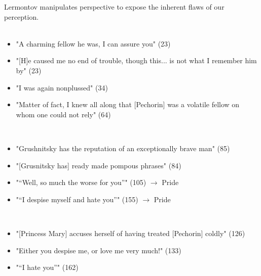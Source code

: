 \documentclass[a4paper]{article}
\begin{document}
    Lermontov manipulates perspective to expose the inherent flaws of our perception.\\

    \\

    \begin{itemize}
        \item "A charming fellow he was, I can assure you" (23)
        \item "[H]e caused me no end of trouble, though this... is not what I
        remember him by" (23)
        \item "I was again nonplussed" (34)
        \item "Matter of fact, I knew all along that [Pechorin] was a volatile fellow
        on whom one could not rely" (64)
    \end{itemize}

    \\

    \begin{itemize}
        \item "Grushnitsky has the reputation of an exceptionally brave man" (85)
        \item "[Grusnitsky has] ready made pompous phrases" (84)
        \item "\enquote{Well, so much the worse for you}" (105) \(\to\) Pride
        \item "\enquote{I despise myself and hate you}" (155) \(\to\) Pride
    \end{itemize}

    \\

    \begin{itemize}
        \item "[Princess Mary] accuses herself of having treated [Pechorin] coldly" (126)
        \item "Either you despise me, or love me very much!" (133)
        \item "\enquote{I hate you}" (162)
    \end{itemize}
\end{document}

